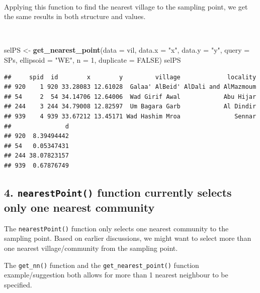 \documentclass[11pt,a4paper]{article}
\newenvironment{Shaded}{}{}
\newcommand{\KeywordTok}[1]{\textcolor[rgb]{0.00,0.44,0.13}{\textbf{#1}}}
\newcommand{\DataTypeTok}[1]{\textcolor[rgb]{0.56,0.13,0.00}{#1}}
\newcommand{\DecValTok}[1]{\textcolor[rgb]{0.25,0.63,0.44}{#1}}
\newcommand{\StringTok}[1]{\textcolor[rgb]{0.25,0.44,0.63}{#1}}
\newcommand{\OtherTok}[1]{\textcolor[rgb]{0.00,0.44,0.13}{#1}}
\newcommand{\NormalTok}[1]{#1}
\begin{document}
~

Applying this function to find the nearest village to the sampling
point, we get the same results in both structure and values.

~

\begin{Shaded}
\begin{Highlighting}[]
\NormalTok{selPS <-}\StringTok{ }\KeywordTok{get_nearest_point}\NormalTok{(}\DataTypeTok{data =}\NormalTok{ vil, }\DataTypeTok{data.x =} \StringTok{"x"}\NormalTok{, }\DataTypeTok{data.y =} \StringTok{"y"}\NormalTok{, }
                           \DataTypeTok{query =}\NormalTok{ SPs, }\DataTypeTok{ellipsoid =} \StringTok{"WE"}\NormalTok{,}
                           \DataTypeTok{n =} \DecValTok{1}\NormalTok{, }\DataTypeTok{duplicate =} \OtherTok{FALSE}\NormalTok{)}
\NormalTok{selPS}
\end{Highlighting}
\end{Shaded}

\begin{verbatim}
##     spid  id        x        y         village             locality
## 920    1 920 33.28083 12.61028  Galaa' AlBeid' AlDali and AlMazmoum
## 54     2  54 34.14706 12.64006  Wad Girif Awal            Abu Hijar
## 244    3 244 34.79008 12.82597  Um Bagara Garb            Al Dindir
## 939    4 939 33.67212 13.45171 Wad Hashim Mroa               Sennar
##               d
## 920  8.39494442
## 54   0.05347431
## 244 38.07823157
## 939  0.67876749
\end{verbatim}

\newpage

\hypertarget{nearestpoint-function-currently-selects-only-one-nearest-community}{%
\subsection{\texorpdfstring{4. \texttt{nearestPoint()} function
currently selects only one nearest
community}{4. nearestPoint() function currently selects only one nearest community}}\label{nearestpoint-function-currently-selects-only-one-nearest-community}}

The \texttt{nearestPoint()} function only selects one nearest community
to the sampling point. Based on earlier discussions, we might want to
select more than one nearest village/community from the sampling point.

The \texttt{get\_nn()} function and the \texttt{get\_nearest\_point()}
function example/suggestion both allows for more than 1 nearest
neighbour to be specified.
\end{document}
